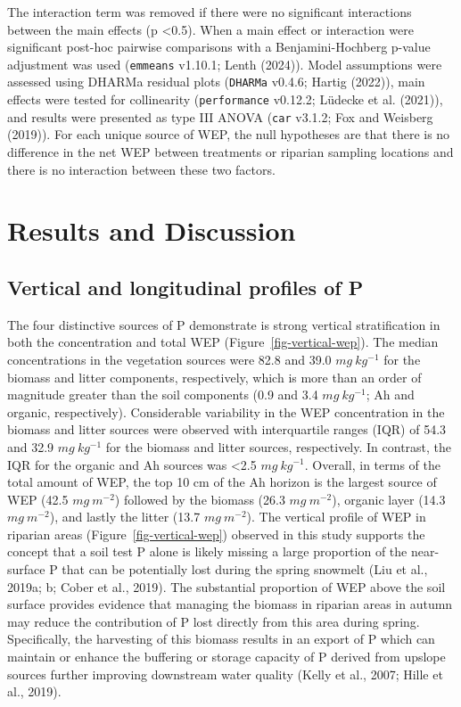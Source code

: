 \documentclass[
]{agujournal2019}
\begin{document}
The interaction term was removed if there were no significant
interactions between the main effects (p \textless0.5). When a main
effect or interaction were significant post-hoc pairwise comparisons
with a Benjamini-Hochberg p-value adjustment was used (\texttt{emmeans}
v1.10.1; Lenth (2024)). Model assumptions were assessed using DHARMa
residual plots (\texttt{DHARMa} v0.4.6; Hartig (2022)), main effects
were tested for collinearity (\texttt{performance} v0.12.2; Lüdecke et
al. (2021)), and results were presented as type III ANOVA (\texttt{car}
v3.1.2; Fox and Weisberg (2019)). For each unique source of WEP, the
null hypotheses are that there is no difference in the net WEP between
treatments or riparian sampling locations and there is no interaction
between these two factors.

\section{Results and Discussion}\label{results-and-discussion}

\subsection{Vertical and longitudinal profiles of
P}\label{vertical-and-longitudinal-profiles-of-p}

The four distinctive sources of P demonstrate is strong vertical
stratification in both the concentration and total WEP
(Figure~\ref{fig-vertical-wep}). The median concentrations in the
vegetation sources were 82.8 and 39.0 \(mg~kg^{-1}\) for the biomass and
litter components, respectively, which is more than an order of
magnitude greater than the soil components (0.9 and 3.4 \(mg~kg^{-1}\);
Ah and organic, respectively). Considerable variability in the WEP
concentration in the biomass and litter sources were observed with
interquartile ranges (IQR) of 54.3 and 32.9 \(mg~kg^{-1}\) for the
biomass and litter sources, respectively. In contrast, the IQR for the
organic and Ah sources was \textless2.5 \(mg~kg^{-1}\). Overall, in
terms of the total amount of WEP, the top 10 cm of the Ah horizon is the
largest source of WEP (42.5 \(mg~m^{-2}\)) followed by the biomass (26.3
\(mg~m^{-2}\)), organic layer (14.3 \(mg~m^{-2}\)), and lastly the
litter (13.7 \(mg~m^{-2}\)). The vertical profile of WEP in riparian
areas (Figure~\ref{fig-vertical-wep}) observed in this study supports
the concept that a soil test P alone is likely missing a large
proportion of the near-surface P that can be potentially lost during the
spring snowmelt (Liu et al., 2019a; b; Cober et al., 2019). The
substantial proportion of WEP above the soil surface provides evidence
that managing the biomass in riparian areas in autumn may reduce the
contribution of P lost directly from this area during spring.
Specifically, the harvesting of this biomass results in an export of P
which can maintain or enhance the buffering or storage capacity of P
derived from upslope sources further improving downstream water quality
(Kelly et al., 2007; Hille et al., 2019).
\end{document}
